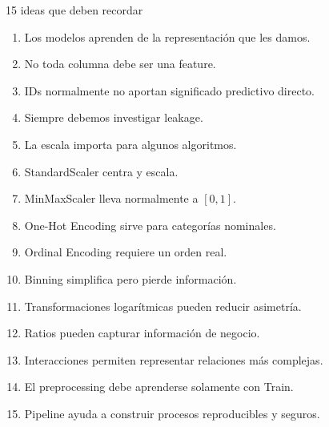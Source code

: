 \documentclass[aspectratio=169,11pt]{beamer}
\begin{document}
\begin{frame}{15 ideas que deben recordar}

\scriptsize

\begin{enumerate}

    \item Los modelos aprenden de la representación que les damos.

    \item No toda columna debe ser una feature.

    \item IDs normalmente no aportan significado predictivo directo.

    \item Siempre debemos investigar leakage.

    \item La escala importa para algunos algoritmos.

    \item StandardScaler centra y escala.

    \item MinMaxScaler lleva normalmente a $[0,1]$.

    \item One-Hot Encoding sirve para categorías nominales.

    \item Ordinal Encoding requiere un orden real.

    \item Binning simplifica pero pierde información.

    \item Transformaciones logarítmicas pueden reducir asimetría.

    \item Ratios pueden capturar información de negocio.

    \item Interacciones permiten representar relaciones más complejas.

    \item El preprocessing debe aprenderse solamente con Train.

    \item Pipeline ayuda a construir procesos reproducibles y seguros.

\end{enumerate}

\end{frame}

\end{document}
